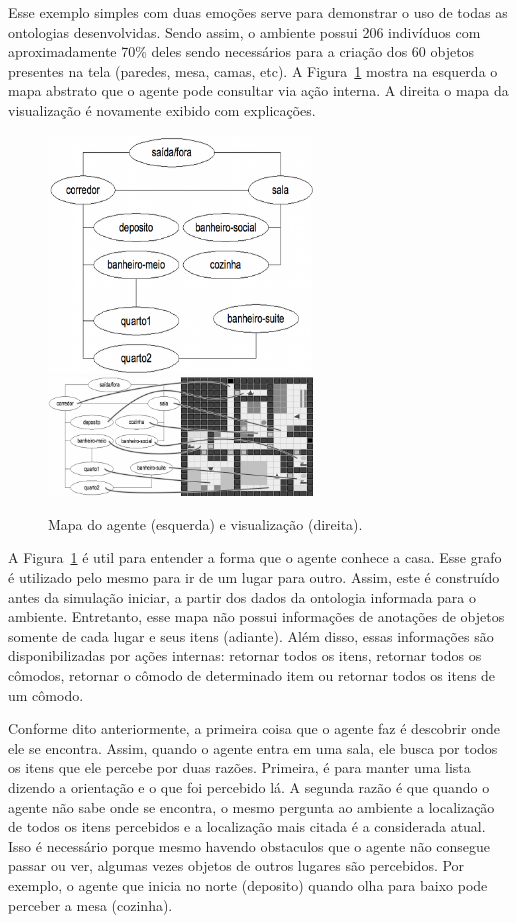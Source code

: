 Esse exemplo simples com duas emoções serve para demonstrar o uso de todas as
ontologias desenvolvidas. Sendo assim, o ambiente possui 206 indivíduos com
aproximadamente 70\% deles sendo necessários para a criação dos 60 objetos
presentes na tela (paredes, mesa, camas, etc). A
Figura~\ref{fig:abstractWindow} mostra na esquerda o mapa abstrato que o agente
pode consultar via ação interna. A direita o mapa da visualização é novamente
exibido com explicações.

\begin{figure}
	\begin{center}
		\includegraphics[width=70mm]{figuras/abstract.png} %
		\includegraphics[width=70mm]{figuras/visualization.png} %
	\end{center}
	\caption{Mapa do agente (esquerda) e visualização (direita).}
	\label{fig:abstractWindow}
\end{figure}

A Figura~\ref{fig:abstractWindow} é util para entender a forma que o agente
conhece a casa. Esse grafo é utilizado pelo mesmo para ir de um lugar para
outro. Assim, este é construído antes da simulação iniciar, a partir dos dados
da ontologia informada para o ambiente. Entretanto, esse mapa não possui
informações de anotações de objetos somente de cada lugar e seus itens
(adiante). Além disso, essas informações são disponibilizadas por ações
internas: retornar todos os itens, retornar todos os cômodos, retornar o
cômodo de determinado item ou retornar todos os itens de um cômodo.

Conforme dito anteriormente, a primeira coisa que o agente faz é descobrir
onde ele se encontra. Assim, quando o agente entra em uma sala, ele busca por
todos os itens que ele percebe por duas razões. Primeira, é para manter uma
lista dizendo a orientação e o que foi percebido lá. A segunda razão é que
quando o agente não sabe onde se encontra, o mesmo pergunta ao ambiente a
localização de todos os itens percebidos e a localização mais citada é a
considerada atual. Isso é necessário porque mesmo havendo obstaculos que o
agente não consegue passar ou ver, algumas vezes objetos de outros lugares são
percebidos. Por exemplo, o agente que inicia no norte (deposito) quando olha
para baixo pode perceber a mesa (cozinha).

